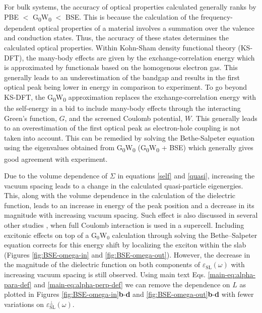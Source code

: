 \documentclass[manuscript=suppinfo,email=true,hyperref=true,keywords=false]{achemso}
\begin{document}
For bulk systems, the accuracy of optical properties calculated
generally ranks by PBE $<$ G\textsubscript{0}W\textsubscript{0} $<$
BSE. This is because the calculation of the frequency-dependent
optical properties of a material involves a summation over the valence
and conduction states. Thus, the accuracy of these states determines
the calculated optical properties. Within Kohn-Sham density functional
theory (KS-DFT), the many-body effects are given by the
exchange-correlation energy which is approximated by functionals based
on the homogenous electron gas. This generally leads to an
underestimation of the bandgap and results in the first optical peak
being lower in energy in comparison to experiment. To go beyond
KS-DFT, the G\textsubscript{0}W\textsubscript{0} approximation
replaces the exchange-correlation energy with the self-energy in a bid
to include many-body effects through the interacting Green's function,
$G$, and the screened Coulomb potential, $W$. This generally leads to
an overestimation of the first optical peak as electron-hole coupling
is not taken into account. This can be remedied by solving the
Bethe-Salpeter equation using the eigenvalues obtained from
G\textsubscript{0}W\textsubscript{0}
(G\textsubscript{0}W\textsubscript{0} + BSE) which generally gives
good agreement with experiment.

Due to the volume dependence of $\Sigma$ in equations \ref{self} and
\ref{quasi}, increasing the vacuum spacing leads to a change in the
calculated quasi-particle eigenergies. This, along with the volume
dependence in the calculation of the dielectric function, leads to an
increase in energy of the peak position and a decrease in its
magnitude with increasing vacuum spacing. Such effect is also
discussed in several other studies
\cite{Rozzi_2006,Hueser_2013_2Dvs3D}, when full Coulomb interaction is
used in a supercell. Including excitonic effects on top of a
G$_0$W$_0$ calculation through solving the Bethe--Salpeter equation
corrects for this energy shift by localizing the exciton within the
slab (Figures \ref{fig:BSE-omega-in} and
\ref{fig:BSE-omega-out}). However, the decrease in the magnitude of
the dielectric function on both components of
$\varepsilon_{\mathrm{SL}}(\omega)$ with increasing vacuum spacing is
still observed.  Using main text Eqs. \ref{main-eq:alpha-para-def} and
\ref{main-eq:alpha-perp-def} we can remove the dependence on $L$ as
plotted in Figures \ref{fig:BSE-omega-in}{\bf b}-{\bf d} and
\ref{fig:BSE-omega-out}{\bf b}-{\bf d} with fewer variations on
$\varepsilon^{\perp}_{\mathrm{SL}}(\omega)$.
\end{document}
